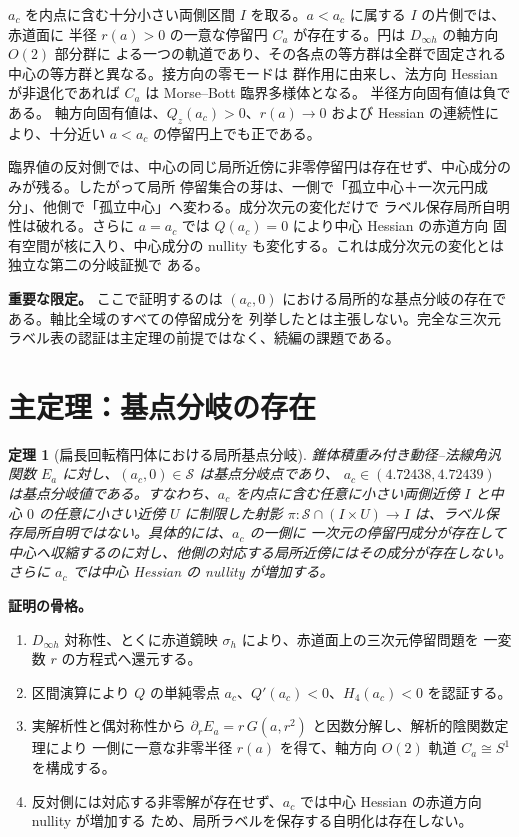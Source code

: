 \documentclass[a4paper,11pt]{ltjsarticle}
\theoremstyle{plain}
\newtheorem{thm}{定理}[section]
\theoremstyle{definition}
\newcommand{\leadin}[1]{\medskip\noindent\textbf{#1}\quad\ignorespaces}
\begin{document}
\(a_c\) を内点に含む十分小さい両側区間 \(I\) を取る。\(a<a_c\) に属する \(I\) の片側では、赤道面に
半径 \(r(a)>0\) の一意な停留円 \(C_a\) が存在する。円は \(D_{\infty h}\) の軸方向 \(O(2)\) 部分群に
よる一つの軌道であり、その各点の等方群は全群で固定される中心の等方群と異なる。接方向の零モードは
群作用に由来し、法方向 Hessian が非退化であれば \(C_a\) は Morse–Bott 臨界多様体となる。 半径方向固有値は負である。
軸方向固有値は、\(Q_z(a_c)>0\)、\(r(a)\to0\) および Hessian の連続性により、十分近い \(a<a_c\) の停留円上でも正である。

臨界値の反対側では、中心の同じ局所近傍に非零停留円は存在せず、中心成分のみが残る。したがって局所
停留集合の芽は、一側で「孤立中心＋一次元円成分」、他側で「孤立中心」へ変わる。成分次元の変化だけで
ラベル保存局所自明性は破れる。さらに \(a=a_c\) では \(Q(a_c)=0\) により中心 Hessian の赤道方向
固有空間が核に入り、中心成分の nullity も変化する。これは成分次元の変化とは独立な第二の分岐証拠で
ある。

\leadin{重要な限定。}
ここで証明するのは \((a_c,0)\) における局所的な基点分岐の存在である。軸比全域のすべての停留成分を
列挙したとは主張しない。完全な三次元ラベル表の認証は主定理の前提ではなく、続編の課題である。

\section{主定理：基点分岐の存在}

\begin{thm}[扁長回転楕円体における局所基点分岐]
\label{thm:main}
錐体積重み付き動径–法線角汎関数 \(E_a\) に対し、\((a_c,0)\in\mathcal{S}\) は基点分岐点であり、
\(a_c\in(4.72438,4.72439)\) は基点分岐値である。すなわち、\(a_c\) を内点に含む任意に小さい両側近傍
\(I\) と中心 \(0\) の任意に小さい近傍 \(U\) に制限した射影
\(\pi:\mathcal{S}\cap(I\times U)\to I\) は、ラベル保存局所自明ではない。具体的には、\(a_c\) の一側に
一次元の停留円成分が存在して中心へ収縮するのに対し、他側の対応する局所近傍にはその成分が存在しない。
さらに \(a_c\) では中心 Hessian の nullity が増加する。
\end{thm}

\leadin{証明の骨格。}
\begin{enumerate}
\item \(D_{\infty h}\) 対称性、とくに赤道鏡映 \(\sigma_h\) により、赤道面上の三次元停留問題を
      一変数 \(r\) の方程式へ還元する。
\item 区間演算により \(Q\) の単純零点 \(a_c\)、\(Q'(a_c)<0\)、\(H_4(a_c)<0\) を認証する。
\item 実解析性と偶対称性から \(\partial_rE_a=r\,G(a,r^2)\) と因数分解し、解析的陰関数定理により
      一側に一意な非零半径 \(r(a)\) を得て、軸方向 \(O(2)\) 軌道 \(C_a\cong S^1\) を構成する。
\item 反対側には対応する非零解が存在せず、\(a_c\) では中心 Hessian の赤道方向 nullity が増加する
      ため、局所ラベルを保存する自明化は存在しない。
\end{enumerate}
\end{document}
